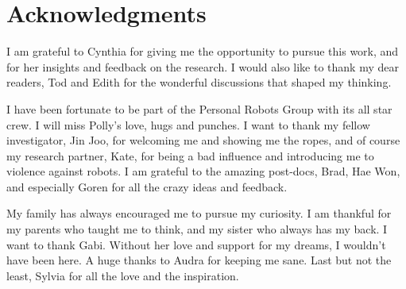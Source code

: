 

\chapter*{Acknowledgments}


\bigskip

I am grateful to Cynthia for giving me the opportunity to pursue this work, and for her insights and feedback on the research.  I would also like to thank my dear readers, Tod and Edith for the wonderful discussions that shaped my thinking. 

I have been fortunate to be part of the Personal Robots Group with its all star crew. I will miss Polly's love, hugs and punches. I want to thank my fellow investigator, Jin Joo, for welcoming me and showing me the ropes, and  of course my research partner, Kate, for being a bad influence and introducing me to violence against robots. I am grateful to the amazing post-docs, Brad, Hae Won, and especially Goren for all the crazy ideas and feedback. 

My family has always encouraged me to pursue my curiosity. I am thankful for my parents who taught me to think, and my sister who always has my back. I want to thank Gabi. Without her love and support for my dreams, I wouldn't have been here. A huge thanks to Audra for keeping me sane. Last but not the least, Sylvia for all the love and the inspiration.




